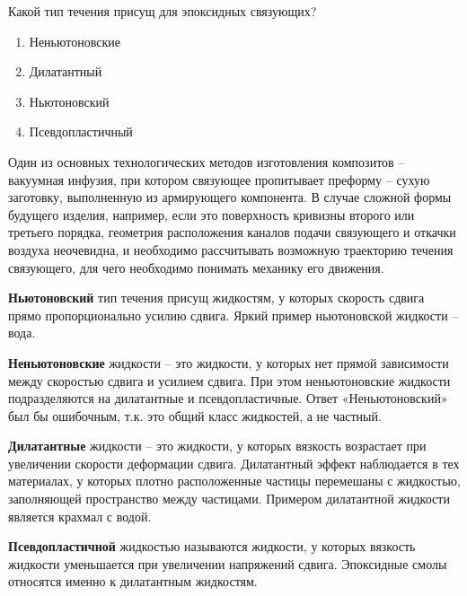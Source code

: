
Какой тип течения присущ для эпоксидных связующих?

\begin{enumerate}
    \item Неньютоновские
    \item Дилатантный
    \item Ньютоновский
    \item Псевдопластичный
\end{enumerate}

\explanationSection

Один из основных технологических методов изготовления композитов – вакуумная инфузия, при котором связующее пропитывает преформу – сухую заготовку, выполненную из армирующего компонента. В случае сложной формы будущего изделия, например, если это поверхность кривизны второго или третьего порядка, геометрия расположения каналов подачи связующего и откачки воздуха неочевидна, и необходимо рассчитывать возможную траекторию течения связующего, для чего необходимо понимать механику его движения.

\textbf{Ньютоновский} тип течения присущ жидкостям, у которых скорость сдвига прямо пропорционально усилию сдвига. Яркий пример ньютоновской жидкости – вода.

\textbf{Неньютоновские} жидкости – это жидкости, у которых нет прямой зависимости между скоростью сдвига и усилием сдвига. При этом неньютоновские жидкости подразделяются на дилатантные и псевдопластичные. Ответ «Неньютоновский» был бы ошибочным, т.к. это общий класс жидкостей, а не частный.

\textbf{Дилатантные} жидкости – это жидкости, у которых вязкость возрастает при увеличении скорости деформации сдвига. Дилатантный эффект наблюдается в тех материалах, у которых плотно расположенные частицы перемешаны с жидкостью, заполняющей пространство между частицами. Примером дилатантной жидкости является крахмал с водой.

\textbf{Псевдопластичной} жидкостью называются жидкости, у которых вязкость жидкости уменьшается при увеличении напряжений сдвига. Эпоксидные смолы относятся именно к дилатантным жидкостям.

